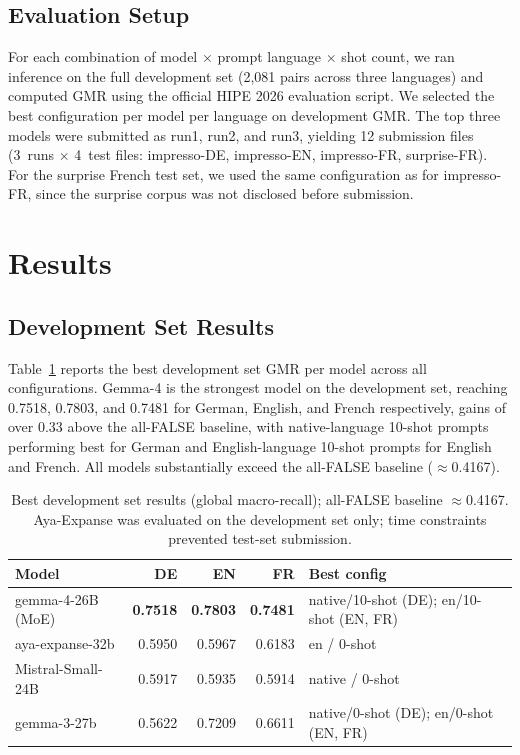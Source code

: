 \documentclass[
]{ceurart}
\theoremstyle{definition}
\begin{document}
\subsection{Evaluation Setup}

For each combination of model $\times$ prompt language $\times$ shot count, we ran inference on the full development set (2,081 pairs across three languages) and computed GMR using the official HIPE 2026 evaluation script.
We selected the best configuration per model per language on development GMR.
The top three models were submitted as run1, run2, and run3, yielding 12 submission files (3~runs $\times$ 4~test files: impresso-DE, impresso-EN, impresso-FR, surprise-FR).
For the surprise French test set, we used the same configuration as for impresso-FR, since the surprise corpus was not disclosed before submission.


\section{Results}
\label{sec:results}

\subsection{Development Set Results}

Table~\ref{tab:dev} reports the best development set GMR per model across all configurations.
Gemma-4 is the strongest model on the development set, reaching 0.7518, 0.7803, and 0.7481 for German, English, and French respectively, gains of over 0.33 above the all-FALSE baseline, with native-language 10-shot prompts performing best for German and English-language 10-shot prompts for English and French.
All models substantially exceed the all-FALSE baseline ($\approx$0.4167).

\begin{table}[t]
\centering
\caption{Best development set results (global macro-recall); all-FALSE baseline $\approx$0.4167. Aya-Expanse was evaluated on the development set only; time constraints prevented test-set submission.}
\label{tab:dev}
\begin{tabular}{lrrrp{5cm}}
\toprule
\textbf{Model} & \textbf{DE} & \textbf{EN} & \textbf{FR} & \textbf{Best config} \\
\midrule
gemma-4-26B (MoE)  & \textbf{0.7518} & \textbf{0.7803} & \textbf{0.7481} & native/10-shot (DE); en/10-shot (EN, FR) \\
aya-expanse-32b    & 0.5950 & 0.5967 & 0.6183 & en / 0-shot \\
Mistral-Small-24B  & 0.5917 & 0.5935 & 0.5914 & native / 0-shot \\
gemma-3-27b        & 0.5622 & 0.7209 & 0.6611 & native/0-shot (DE); en/0-shot (EN, FR) \\
\bottomrule
\end{tabular}
\end{table}
\end{document}
